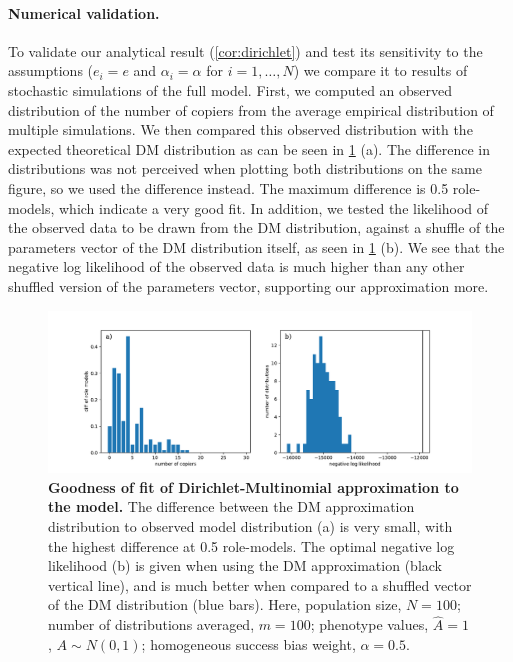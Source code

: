 \documentclass[12pt]{extarticle}
\begin{document}
\paragraph{Numerical validation.}
To validate our analytical result (\cref{cor:dirichlet}) and test its sensitivity to the assumptions ($e_i=e$ and $\alpha_i=\alpha$ for $i=1,\ldots,N$) we compare it to results of stochastic simulations of the full model.
First, we computed an observed distribution of the number of copiers from the average empirical distribution of multiple simulations.
We then compared this observed distribution with the expected theoretical DM distribution as can be seen in \cref{fig:DM_validation} (a). The difference in distributions was not perceived when plotting both distributions on the same figure, so we used the difference instead. The maximum difference is 0.5 role-models, which indicate a very good fit.
In addition, we tested the likelihood of the observed data to be drawn from the DM distribution, against a shuffle of the parameters vector of the DM distribution itself, as seen in \cref{fig:DM_validation} (b). We see that the negative log likelihood of the observed data is much higher than any other shuffled version of the parameters vector, supporting our approximation more.


\begin{figure}[h]
    \includegraphics[width=\linewidth]{../figures/chi_square_stats/DM_validation.pdf}
  \caption{
  \textbf{Goodness of fit of Dirichlet-Multinomial approximation to the model.}
  The difference between the DM approximation distribution to observed model distribution (a) is very small, with the highest difference at 0.5 role-models.
  The optimal negative log likelihood (b) is given when using the DM approximation (black vertical line), and is much better when compared to a shuffled vector of the DM distribution (blue bars).
  Here, population size, $N=100$; number of distributions averaged, $m=100$; phenotype values, $\hat{A}=1$, $A \sim N(0,1)$; homogeneous success bias weight, $\alpha=0.5$.}	
  \label{fig:DM_validation}
\end{figure}
\end{document}
